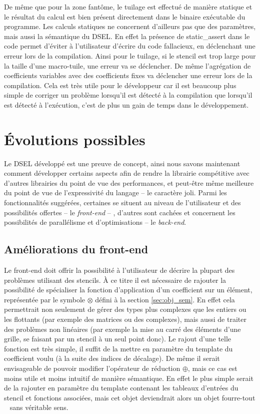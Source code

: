 De même que pour la zone fantôme, le tuilage est effectué de manière statique et le résultat du calcul est bien présent directement dans le binaire exécutable du programme. Les calculs statiques ne concernent d'ailleurs pas que des paramètres, mais aussi la sémantique du DSEL. En effet la présence de \textsf{static\_assert} dans le code permet d'éviter à l'utilisateur d'écrire du code fallacieux, en déclenchant une erreur lors de la compilation. Ainsi pour le tuilage, si le stencil est trop large pour la taille d'une macro-tuile, une erreur va se déclencher. De même l'agrégation de coefficients variables avec des coefficients fixes va déclencher une erreur lors de la compilation. Cela est très utile pour le développeur car il est beaucoup plus simple de corriger un problème lorsqu'il est détecté à la compilation que lorsqu'il est détecté à l'exécution, c'est de plus un gain de temps dans le développement. 

\section{\'Evolutions possibles}
\label{sec:evol_biblio}

Le DSEL développé est une preuve de concept, ainsi nous savons maintenant comment développer certains aspects afin de rendre la librairie compétitive avec d'autres librairies du point de vue des performances, et peut-être même meilleure du point de vue de l'expressivité du langage -- le caractère joli. Parmi les fonctionnalités suggérées, certaines se situent au niveau de l'utilisateur et des possibilités offertes -- le \emph{front-end} -- , d'autres sont cachées et concernent les possibilités de parallélisme et d'optimisations -- le \emph{back-end}.

\subsection{Améliorations du front-end}

Le front-end doit offrir la possibilité à l'utilisateur de décrire la plupart des problèmes utilisant des stencils. À ce titre il est nécessaire de rajouter la possibilité de spécialiser la fonction d'application d'un coefficient sur un élément, représentée par le symbole $\otimes$ défini à la section \ref{sec:obj_sem}. En effet cela permettrait non seulement de gérer des types plus complexes que les entiers ou les flottants (par exemple des matrices ou des complexes), mais aussi de traiter des problèmes non linéaires (par exemple la mise au carré des éléments d'une grille, se faisant par un stencil à un seul point donc). Le rajout d'une telle fonction est très simple, il suffit de la mettre en paramètre du template du coefficient voulu (à la suite des indices de décalage). De même il serait envisageable de pouvoir modifier l'opérateur de réduction $\oplus$, mais ce cas est moins utile et moins intuitif de manière sémantique. En effet le plus simple serait de la rajouter en paramètre du template contenant les tableaux d'entrées du stencil et fonctions associées, mais cet objet deviendrait alors un objet \og fourre-tout \fg~ sans véritable sens. 

